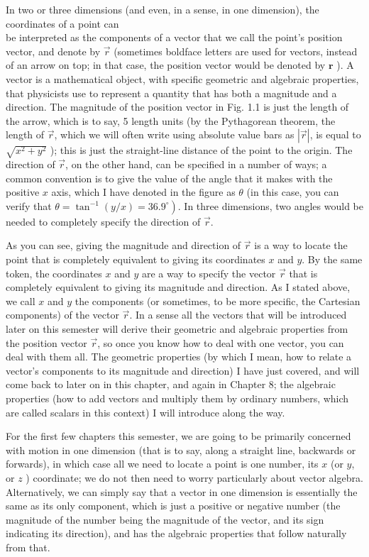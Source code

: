 \documentclass[10pt]{article}
\begin{document}
In two or three dimensions (and even, in a sense, in one dimension), the coordinates of a point can\\
be interpreted as the components of a vector that we call the point's position vector, and denote by $\vec{r}$ (sometimes boldface letters are used for vectors, instead of an arrow on top; in that case, the position vector would be denoted by $\mathbf{r}$ ). A vector is a mathematical object, with specific geometric and algebraic properties, that physicists use to represent a quantity that has both a magnitude and a direction. The magnitude of the position vector in Fig. 1.1 is just the length of the arrow, which is to say, 5 length units (by the Pythagorean theorem, the length of $\vec{r}$, which we will often write using absolute value bars as $|\vec{r}|$, is equal to $\sqrt{x^{2}+y^{2}}$ ); this is just the straight-line distance of the point to the origin. The direction of $\vec{r}$, on the other hand, can be specified in a number of ways; a common convention is to give the value of the angle that it makes with the positive $x$ axis, which I have denoted in the figure as $\theta$ (in this case, you can verify that $\left.\theta=\tan ^{-1}(y / x)=36.9^{\circ}\right)$. In three dimensions, two angles would be needed to completely specify the direction of $\vec{r}$.

As you can see, giving the magnitude and direction of $\vec{r}$ is a way to locate the point that is completely equivalent to giving its coordinates $x$ and $y$. By the same token, the coordinates $x$ and $y$ are a way to specify the vector $\vec{r}$ that is completely equivalent to giving its magnitude and direction. As I stated above, we call $x$ and $y$ the components (or sometimes, to be more specific, the Cartesian components) of the vector $\vec{r}$. In a sense all the vectors that will be introduced later on this semester will derive their geometric and algebraic properties from the position vector $\vec{r}$, so once you know how to deal with one vector, you can deal with them all. The geometric properties (by which I mean, how to relate a vector's components to its magnitude and direction) I have just covered, and will come back to later on in this chapter, and again in Chapter 8; the algebraic properties (how to add vectors and multiply them by ordinary numbers, which are called scalars in this context) I will introduce along the way.

For the first few chapters this semester, we are going to be primarily concerned with motion in one dimension (that is to say, along a straight line, backwards or forwards), in which case all we need to locate a point is one number, its $x$ (or $y$, or $z$ ) coordinate; we do not then need to worry particularly about vector algebra. Alternatively, we can simply say that a vector in one dimension is essentially the same as its only component, which is just a positive or negative number (the magnitude of the number being the magnitude of the vector, and its sign indicating its direction), and has the algebraic properties that follow naturally from that.
\end{document}
